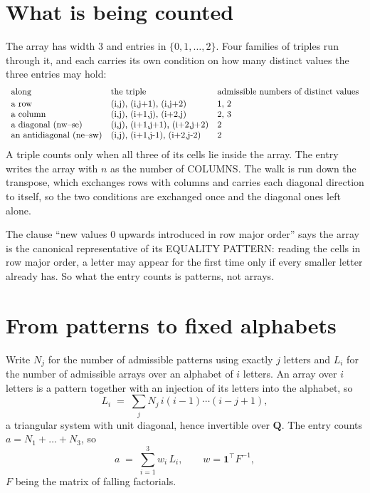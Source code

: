 \documentclass[11pt,a4paper]{article}
\theoremstyle{plain}
\theoremstyle{definition}
\begin{document}
\section{What is being counted}

The array has width $3$ and entries in $\{0,1,\dots,2\}$. Four families of triples
run through it, and each carries its own condition on how many distinct values the three
entries may hold:
\[
\begin{array}{lll}
\text{along} & \text{the triple} & \text{admissible numbers of distinct values} \\[2pt]
\text{a row} & $(i,j),\ (i,j+1),\ (i,j+2)$ & $1, 2$ \\
\text{a column} & $(i,j),\ (i+1,j),\ (i+2,j)$ & $2, 3$ \\
\text{a diagonal (nw--se)} & $(i,j),\ (i+1,j+1),\ (i+2,j+2)$ & $2$ \\
\text{an antidiagonal (ne--sw)} & $(i,j),\ (i+1,j-1),\ (i+2,j-2)$ & $2$ \\
\end{array}
\]
A triple counts only when all three of its cells lie inside the array. The entry writes the array with $n$ as the number of COLUMNS. The walk is run down the transpose, which exchanges rows with columns and carries each diagonal direction to itself, so the two conditions are exchanged once and the diagonal ones left alone.

The clause ``new values $0$ upwards introduced in row major order'' says the array is the
canonical representative of its EQUALITY PATTERN: reading the cells in row major order, a
letter may appear for the first time only if every smaller letter already has. So what the
entry counts is patterns, not arrays.

\section{From patterns to fixed alphabets}

Write $N_j$ for the number of admissible patterns using exactly $j$ letters and $L_i$ for the
number of admissible arrays over an alphabet of $i$ letters. An array over $i$ letters is a
pattern together with an injection of its letters into the alphabet, so
\[
L_i\;=\;\sum_j N_j\,i(i-1)\cdots(i-j+1),
\]
a triangular system with unit diagonal, hence invertible over $\mathbf{Q}$. The entry counts
$a=N_1+\dots+N_{3}$, so
\[
a\;=\;\sum_{i=1}^{3}w_i\,L_i ,\qquad w=\mathbf{1}^{\!\top}F^{-1},
\]
$F$ being the matrix of falling factorials.
\end{document}
